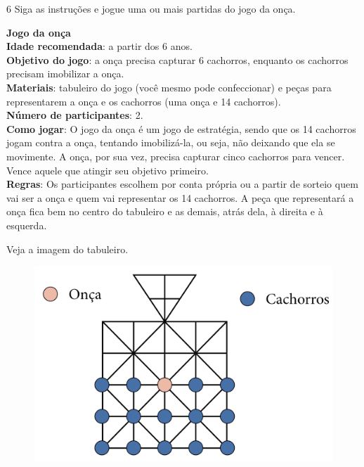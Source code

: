 
\pagebreak
\num{6} Siga as instruções e jogue uma ou mais partidas do jogo da onça.

\begin{myquote}
\textbf{Jogo da onça}\\
\textbf{Idade recomendada}: a partir dos 6 anos.\\
\textbf{Objetivo do jogo}: a onça precisa capturar 6 cachorros, enquanto
os cachorros precisam imobilizar a onça.\\
\textbf{Materiais}: tabuleiro do jogo (você mesmo pode confeccionar) e
peças para representarem a onça e os cachorros (uma onça e 14
cachorros).\\
\textbf{Número de participantes}: 2.\\
\textbf{Como jogar}: O jogo da onça é um jogo de estratégia, sendo que
os 14 cachorros jogam contra a onça, tentando imobilizá-la, ou seja, não
deixando que ela se movimente. A onça, por sua vez, precisa capturar
cinco cachorros para vencer. Vence aquele que atingir seu objetivo
primeiro.\\
\textbf{Regras}: Os participantes escolhem por conta própria ou a partir
de sorteio quem vai ser a onça e quem vai representar os 14 cachorros. A
peça que representará a onça fica bem no centro do tabuleiro e as
demais, atrás dela, à direita e à esquerda.
\end{myquote}

Veja a imagem do tabuleiro.

\begin{figure}[htpb!]
\includegraphics[width=\textwidth]{../ilustracoes/ART5/SAEB_5ANO_ART_FIGURA16.png}
\end{figure}

